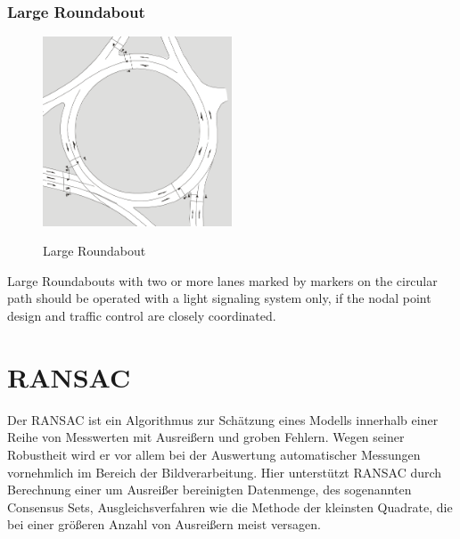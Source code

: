 \subsubsection{Large Roundabout}


\begin{figure}[!ht]
\caption{Large Roundabout \cite{man06}}
\includegraphics[width=0.5\textwidth]{bilder/large_roundabout.png} %
\label{roundabout_large}
\end{figure}

Large Roundabouts with two or more lanes marked by markers on the circular path should be operated with a light signaling system only,
if the nodal point design and traffic control are closely coordinated.


\section{\acl{RANSAC}}

Der \ac{RANSAC} \cite{Fischler1981} ist ein Algorithmus zur Schätzung eines Modells innerhalb einer Reihe von Messwerten mit Ausreißern und groben Fehlern. Wegen seiner Robustheit wird er vor allem bei der Auswertung automatischer Messungen vornehmlich im Bereich der Bildverarbeitung. 
Hier unterstützt \ac{RANSAC} durch Berechnung einer um Ausreißer bereinigten Datenmenge, des sogenannten Consensus Sets, Ausgleichsverfahren wie die Methode der kleinsten Quadrate, die bei einer größeren Anzahl von Ausreißern meist versagen.

